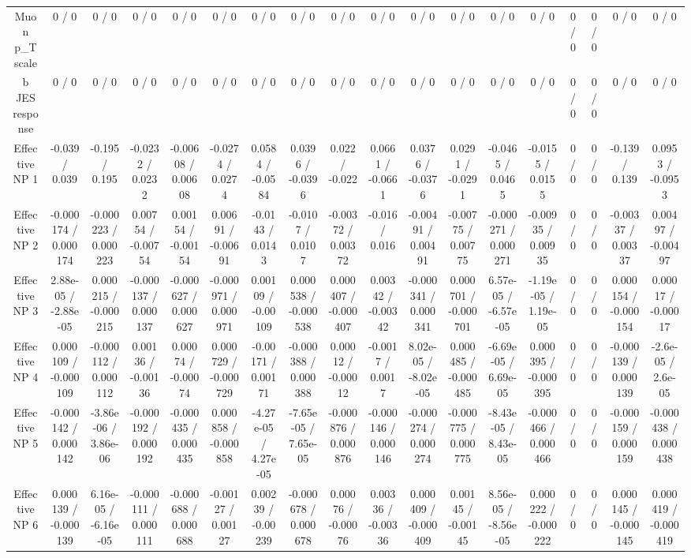 \documentclass[10pt]{article}
\begin{document}
\begin{table}[htbp]
\begin{center}
\begin{tabular}{|c|c|c|c|c|c|c|c|c|c|c|c|c|c|c|c|c|c|}
  Muon p_{T} scale & 0 / 0 & 0 / 0 & 0 / 0 & 0 / 0 & 0 / 0 & 0 / 0 & 0 / 0 & 0 / 0 & 0 / 0 & 0 / 0 & 0 / 0 & 0 / 0 & 0 / 0 & 0 / 0 & 0 / 0 & 0 / 0 & 0 / 0 \\ 
  b JES response & 0 / 0 & 0 / 0 & 0 / 0 & 0 / 0 & 0 / 0 & 0 / 0 & 0 / 0 & 0 / 0 & 0 / 0 & 0 / 0 & 0 / 0 & 0 / 0 & 0 / 0 & 0 / 0 & 0 / 0 & 0 / 0 & 0 / 0 \\ 
  Effective NP 1 & -0.039 / 0.039 & -0.195 / 0.195 & -0.0232 / 0.0232 & -0.00608 / 0.00608 & -0.0274 / 0.0274 & 0.0584 / -0.0584 & 0.0396 / -0.0396 & 0.022 / -0.022 & 0.0661 / -0.0661 & 0.0376 / -0.0376 & 0.0291 / -0.0291 & -0.0465 / 0.0465 & -0.0155 / 0.0155 & 0 / 0 & 0 / 0 & -0.139 / 0.139 & 0.0953 / -0.0953 \\ 
  Effective NP 2 & -0.000174 / 0.000174 & -0.000223 / 0.000223 & 0.00754 / -0.00754 & 0.00154 / -0.00154 & 0.00691 / -0.00691 & -0.0143 / 0.0143 & -0.0107 / 0.0107 & -0.00372 / 0.00372 & -0.016 / 0.016 & -0.00491 / 0.00491 & -0.00775 / 0.00775 & -0.000271 / 0.000271 & -0.00935 / 0.00935 & 0 / 0 & 0 / 0 & -0.00337 / 0.00337 & 0.00497 / -0.00497 \\ 
  Effective NP 3 & 2.88e-05 / -2.88e-05 & 0.000215 / -0.000215 & -0.000137 / 0.000137 & -0.000627 / 0.000627 & -0.000971 / 0.000971 & 0.00109 / -0.00109 & 0.000538 / -0.000538 & 0.000407 / -0.000407 & 0.00342 / -0.00342 & -0.000341 / 0.000341 & 0.000701 / -0.000701 & 6.57e-05 / -6.57e-05 & -1.19e-05 / 1.19e-05 & 0 / 0 & 0 / 0 & 0.000154 / -0.000154 & 0.00017 / -0.00017 \\ 
  Effective NP 4 & 0.000109 / -0.000109 & -0.000112 / 0.000112 & 0.00136 / -0.00136 & 0.00074 / -0.00074 & 0.000729 / -0.000729 & -0.00171 / 0.00171 & -0.000388 / 0.000388 & 0.00012 / -0.00012 & -0.0017 / 0.0017 & 8.02e-05 / -8.02e-05 & 0.000485 / -0.000485 & -6.69e-05 / 6.69e-05 & 0.000395 / -0.000395 & 0 / 0 & 0 / 0 & -0.000139 / 0.000139 & -2.6e-05 / 2.6e-05 \\ 
  Effective NP 5 & -0.000142 / 0.000142 & -3.86e-06 / 3.86e-06 & -0.000192 / 0.000192 & -0.000435 / 0.000435 & 0.000858 / -0.000858 & -4.27e-05 / 4.27e-05 & -7.65e-05 / 7.65e-05 & -0.000876 / 0.000876 & -0.000146 / 0.000146 & -0.000274 / 0.000274 & -0.000775 / 0.000775 & -8.43e-05 / 8.43e-05 & -0.000466 / 0.000466 & 0 / 0 & 0 / 0 & -0.000159 / 0.000159 & -0.000438 / 0.000438 \\ 
  Effective NP 6 & 0.000139 / -0.000139 & 6.16e-05 / -6.16e-05 & -0.000111 / 0.000111 & -0.000688 / 0.000688 & -0.00127 / 0.00127 & 0.00239 / -0.00239 & -0.000678 / 0.000678 & 0.00076 / -0.00076 & 0.00336 / -0.00336 & 0.000409 / -0.000409 & 0.00145 / -0.00145 & 8.56e-05 / -8.56e-05 & 0.000222 / -0.000222 & 0 / 0 & 0 / 0 & 0.000145 / -0.000145 & 0.000419 / -0.000419 \\ 

\end{tabular}
\end{center}
\end{table}
\end{document}

